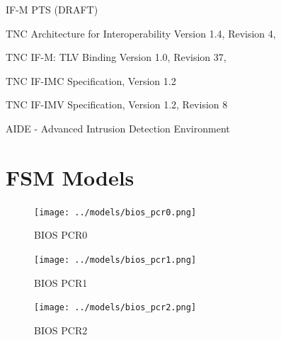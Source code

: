 \documentclass[12pt,a4paper]{article}
\begin{document}
\begin{thebibliography}{9}
  IF-M PTS (DRAFT)

  TNC Architecture for Interoperability Version 1.4, Revision 4, 

  TNC IF-M: TLV Binding Version 1.0, Revision 37, 

  TNC IF-IMC Specification, Version 1.2

  TNC IF-IMV Specification, Version 1.2, Revision 8

  AIDE - Advanced Intrusion Detection Environment

\end{thebibliography}


\clearpage 
\appendix
\section{FSM Models}

\begin{figure}[h]
  \begin{center}
    \texttt{[image: ../models/bios\_pcr0.png]}
  \end{center}
  \caption{BIOS PCR0}
  \label{fig:fsm:biospcr0} 
\end{figure}

\begin{figure}[h]
  \begin{center}
    \texttt{[image: ../models/bios\_pcr1.png]}
  \end{center}
  \caption{BIOS PCR1}
  \label{fig:fsm:biospcr1} 
\end{figure}

\begin{figure}[h]
  \begin{center}
    \texttt{[image: ../models/bios\_pcr2.png]}
  \end{center}
  \caption{BIOS PCR2}
  \label{fig:fsm:biospcr2} 
\end{figure}
\end{document}
